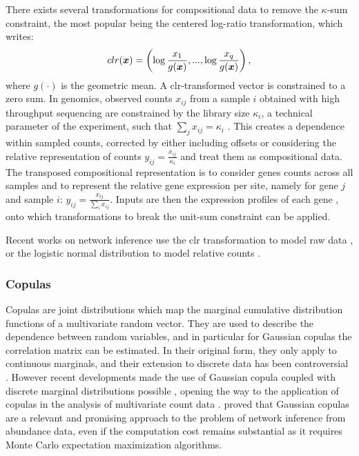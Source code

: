 There exists several transformations for compositional data to remove the $\kappa$-sum constraint, the most popular being the centered log-ratio transformation, which writes:
$$clr({\boldsymbol{x}})=\left(\log \frac{x_1}{g(\boldsymbol{x})}, ..., \log \frac{x_q}{g(\boldsymbol{x})}\right), $$
where $g(\cdot)$ is the geometric mean. A clr-transformed vector is constrained to a zero sum. In genomics, observed counts $x_{ij}$ from a sample $i$ obtained with high throughput sequencing are constrained by the library size $\kappa_i$, a technical parameter of the experiment, such that $\sum_j x_{ij}=\kappa_i$ \citep{GMP17}. This creates a dependence within sampled counts, corrected  by either including offsets or  considering the relative representation of counts $y_{ij}=\frac{x_{ij}}{\kappa_i}$ and treat them as compositional data. The transposed compositional representation is to consider  genes counts across all samples and to represent the relative gene expression per site, namely for gene $j$ and sample $i$: $y_{ij}=\frac{x_{ij}}{\sum_i x_{ij}}$. Inputs are then the expression profiles of each gene \citep{RMR18}, onto which transformations to break the unit-sum constraint can be applied. 

Recent works on network inference use the clr transformation to model raw data \citep{kurtz}, or the logistic normal distribution \citep{AS80} to model relative counts \citep{gcoda}.
\subsubsection{Copulas}
Copulas are  joint  distributions which map the marginal  cumulative distribution functions of a multivariate random vector.  They are used to describe the dependence between random variables, and in particular for Gaussian copulas the correlation matrix can be estimated. In their original form, they only apply to continuous marginals, and their extension to discrete data has been controversial \citep{F17}. However recent developments made the use of  Gaussian copula coupled with discrete marginal distributions possible \citep{PCJ12,PHW18}, opening the way to the application of copulas in the analysis of multivariate count data \citep{AVP19}. \citet{PWT19} proved that  Gaussian copulas are a relevant and promising approach to the problem of network inference from abundance data, even if the computation cost remains substantial as it requires  Monte Carlo expectation maximization algorithms.


